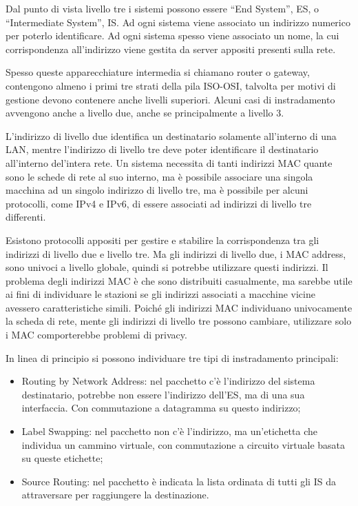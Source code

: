 \documentclass{article}
\numberwithin{equation}{subsection}
\begin{document}
Dal punto di vista livello tre i sistemi possono essere ``End System'', ES, o ``Intermediate System'', IS. Ad ogni sistema viene associato un indirizzo numerico per 
poterlo identificare. Ad ogni sistema spesso viene associato un nome, la cui corrispondenza all'indirizzo viene gestita da server appositi presenti sulla rete. 

Spesso queste apparecchiature intermedia si chiamano router o gateway, contengono almeno i primi tre strati della pila ISO-OSI, talvolta per motivi di gestione devono 
contenere anche livelli superiori. Alcuni casi di instradamento avvengono anche a livello due, anche se principalmente a livello 3. 


L'indirizzo di livello due identifica un destinatario solamente all'interno di una LAN, mentre l'indirizzo di livello tre deve poter identificare il destinatario 
all'interno del'intera rete. Un sistema necessita di tanti indirizzi MAC quante sono le schede di rete al suo interno, ma è possibile associare una singola macchina 
ad un singolo indirizzo di livello tre, ma è possibile per alcuni protocolli, come IPv4 e IPv6, di essere associati ad indirizzi di livello tre differenti.  

Esistono protocolli appositi per gestire e stabilire la corrispondenza tra gli indirizzi di livello due e livello tre. Ma gli indirizzi di livello due, i MAC address, 
sono univoci a livello globale, quindi si potrebbe utilizzare questi indirizzi. Il problema degli indirizzi MAC è che sono distribuiti casualmente, ma sarebbe utile 
ai fini di individuare le stazioni se gli indirizzi associati a macchine vicine avessero caratteristiche simili. Poiché gli indirizzi MAC individuano univocamente 
la scheda di rete, mente gli indirizzi di livello tre possono cambiare, utilizzare solo i MAC comporterebbe problemi di privacy. 

In linea di principio si possono individuare tre tipi di instradamento principali:
\begin{itemize}
    \item Routing by Network Address: nel pacchetto c'è l'indirizzo del sistema destinatario, potrebbe non essere l'indirizzo dell'ES, ma di una sua interfaccia. Con commutazione a datagramma su questo indirizzo;
    \item Label Swapping: nel pacchetto non c'è l'indirizzo, ma un'etichetta che individua un cammino virtuale, con commutazione a circuito virtuale basata su queste etichette;
    \item Source Routing: nel pacchetto è indicata la lista ordinata di tutti gli IS da attraversare per raggiungere la destinazione. 
\end{itemize}
\end{document}

